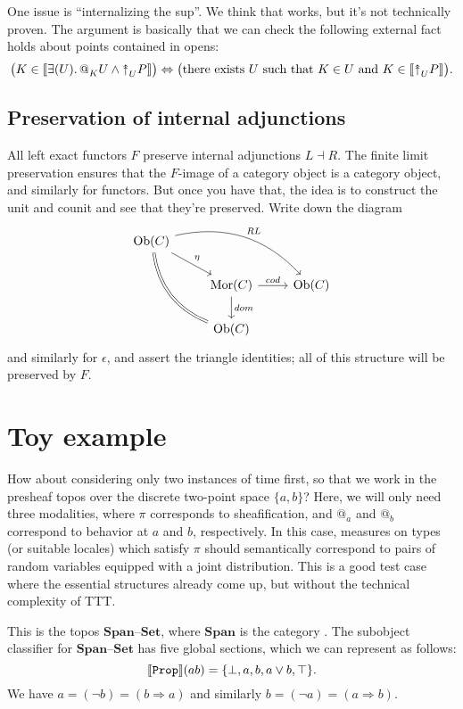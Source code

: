 \documentclass[11pt, oneside, article]{memoir}
\makeatletter
\theoremstyle{plain}
\theoremstyle{definition}
\theoremstyle{remark}
\DeclarePairedDelimiter{\church}{\llbracket}{\rrbracket}
\DeclareMathOperator{\Mor}{Mor}
\DeclareMathOperator{\Ob}{Ob}
\newcommand{\const}[1]{\mathtt{#1}}
\newcommand{\Cat}[1]{\mathbf{#1}}
\newcommand{\smset}{\Cat{Set}}
\newcommand{\from}{\leftarrow}
\newcommand{\Prop}{\const{Prop}}
\newcommand{\AtSymbol}{{@}}
\newcommand{\InSymbol}{{\upclose}}%
\newcommand{\At}[2][]{\AtSymbol^{#1}_{#2}}
\newcommand{\In}[2][]{\InSymbol^{#1}_{#2}}
\newcommand{\upclose}{{\rotatebox[origin=c]{90}{$\twoheadrightarrow$}}}
\newcommand{\imp}{\Rightarrow}
\renewcommand{\iff}{\Leftrightarrow}
\newcommand{\Span}{\Cat{Span}}
\newcommand{\set}{\text{--}\smset}
\makeatother
\begin{document}
One issue is ``internalizing the sup''. We think that works, but it's not technically proven. The argument is basically that we can check the following external fact holds about points contained in opens:
\[\big(K\in\church{\exists(U)\ldotp\At{K}U\wedge\In{U}P}\big)\iff\big(\text{there exists $U$ such that $K\in U$ and }K\in\church{\In{U}P}\big).\]

\section{Preservation of internal adjunctions}

All left exact functors $F$ preserve internal adjunctions $L\dashv R$. The finite limit preservation ensures that the $F$-image of a category object is a category object, and similarly for functors. But once you have that, the idea is to construct the unit and counit and see that they're preserved. Write down the diagram
\[
\begin{tikzcd}
	\Ob(C)\ar[drr, bend left, "RL"]\ar[ddr, bend right, equal]\ar[dr, "\eta"]\\
	&\Mor(C)\ar[r, "cod"]\ar[d, "dom"]&\Ob(C)\\
	&\Ob(C)
\end{tikzcd}
\]
and similarly for $\epsilon$, and assert the triangle identities; all of this structure will be preserved by $F$.

\chapter{Toy example}


How about considering only two instances of time first, so that we work in the presheaf topos over the discrete two-point space $\{a,b\}$? Here, we will only need three modalities, where $\pi$ corresponds to sheafification, and $\At{a}{}$ and $\At{b}{}$ correspond to behavior at $a$ and $b$, respectively. In this case, measures on types (or suitable locales) which satisfy $\pi$ should semantically correspond to pairs of random variables equipped with a joint distribution. This is a good test case where the essential structures already come up, but without the technical complexity of TTT.

This is the topos $\Span\set$, where $\Span$ is the category \fbox{$a\from ab\to b$}. The subobject classifier for $\Span\set$ has five global sections, which we can represent as follows:
\[\church{\Prop}(ab)=\{\bot,a,b,a\vee b,\top\}.\]
We have $a=(\neg b)=(b\imp a)$ and similarly $b=(\neg a)=(a\imp b)$.
\end{document}
